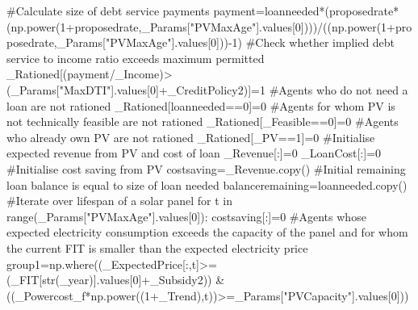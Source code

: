 \documentclass[
  letterpaper,
  DIV=11,
  numbers=noendperiod]{scrartcl}
\newenvironment{Shaded}{\begin{snugshade}}{\end{snugshade}}
\newcommand{\BuiltInTok}[1]{\textcolor[rgb]{0.00,0.23,0.31}{#1}}
\newcommand{\CommentTok}[1]{\textcolor[rgb]{0.37,0.37,0.37}{#1}}
\newcommand{\ControlFlowTok}[1]{\textcolor[rgb]{0.00,0.23,0.31}{#1}}
\newcommand{\DecValTok}[1]{\textcolor[rgb]{0.68,0.00,0.00}{#1}}
\newcommand{\KeywordTok}[1]{\textcolor[rgb]{0.00,0.23,0.31}{#1}}
\newcommand{\NormalTok}[1]{\textcolor[rgb]{0.00,0.23,0.31}{#1}}
\newcommand{\OperatorTok}[1]{\textcolor[rgb]{0.37,0.37,0.37}{#1}}
\newcommand{\StringTok}[1]{\textcolor[rgb]{0.13,0.47,0.30}{#1}}
\begin{document}
\begin{Shaded}
\begin{Highlighting}[]
    \CommentTok{\#Calculate size of debt service payments}
\NormalTok{    payment}\OperatorTok{=}\NormalTok{loanneeded}\OperatorTok{*}\NormalTok{(proposedrate}\OperatorTok{*}\NormalTok{(np.power(}\DecValTok{1}\OperatorTok{+}\NormalTok{proposedrate,\_Params[}\StringTok{"PVMaxAge"}\NormalTok{].values[}\DecValTok{0}\NormalTok{])))}\OperatorTok{/}\NormalTok{((np.power(}\DecValTok{1}\OperatorTok{+}\NormalTok{proposedrate,\_Params[}\StringTok{"PVMaxAge"}\NormalTok{].values[}\DecValTok{0}\NormalTok{]))}\OperatorTok{{-}}\DecValTok{1}\NormalTok{)}
    \CommentTok{\#Check whether implied debt service to income ratio exceeds maximum permitted}
\NormalTok{    \_Rationed[(payment}\OperatorTok{/}\NormalTok{\_Income)}\OperatorTok{\textgreater{}}\NormalTok{(\_Params[}\StringTok{"MaxDTI"}\NormalTok{].values[}\DecValTok{0}\NormalTok{]}\OperatorTok{+}\NormalTok{\_CreditPolicy2)]}\OperatorTok{=}\DecValTok{1}
    \CommentTok{\#Agents who do not need a loan are not rationed}
\NormalTok{    \_Rationed[loanneeded}\OperatorTok{==}\DecValTok{0}\NormalTok{]}\OperatorTok{=}\DecValTok{0}
    \CommentTok{\#Agents for whom PV is not technically feasible are not rationed}
\NormalTok{    \_Rationed[\_Feasible}\OperatorTok{==}\DecValTok{0}\NormalTok{]}\OperatorTok{=}\DecValTok{0}
    \CommentTok{\#Agents who already own PV are not rationed}
\NormalTok{    \_Rationed[\_PV}\OperatorTok{==}\DecValTok{1}\NormalTok{]}\OperatorTok{=}\DecValTok{0}
    \CommentTok{\#Initialise expected revenue from PV and cost of loan}
\NormalTok{    \_Revenue[:]}\OperatorTok{=}\DecValTok{0}
\NormalTok{    \_LoanCost[:]}\OperatorTok{=}\DecValTok{0}
    \CommentTok{\#Initialise cost saving from PV}
\NormalTok{    costsaving}\OperatorTok{=}\NormalTok{\_Revenue.copy()}
    \CommentTok{\#Initial remaining loan balance is equal to size of loan needed}
\NormalTok{    balanceremaining}\OperatorTok{=}\NormalTok{loanneeded.copy()}
    \CommentTok{\#Iterate over lifespan of a solar panel}
    \ControlFlowTok{for}\NormalTok{ t }\KeywordTok{in} \BuiltInTok{range}\NormalTok{(\_Params[}\StringTok{"PVMaxAge"}\NormalTok{].values[}\DecValTok{0}\NormalTok{]):}
\NormalTok{        costsaving[:]}\OperatorTok{=}\DecValTok{0}
        \CommentTok{\#Agents whose expected electricity consumption exceeds the capacity of the panel and for whom the current FIT is smaller than the expected electricity price}
\NormalTok{        group1}\OperatorTok{=}\NormalTok{np.where((\_ExpectedPrice[:,t]}\OperatorTok{\textgreater{}=}\NormalTok{(\_FIT[}\BuiltInTok{str}\NormalTok{(\_year)].values[}\DecValTok{0}\NormalTok{]}\OperatorTok{+}\NormalTok{\_Subsidy2)) }\OperatorTok{\&}\NormalTok{ ((\_Powercost\_f}\OperatorTok{*}\NormalTok{np.power((}\DecValTok{1}\OperatorTok{+}\NormalTok{\_Trend),t))}\OperatorTok{\textgreater{}=}\NormalTok{\_Params[}\StringTok{"PVCapacity"}\NormalTok{].values[}\DecValTok{0}\NormalTok{]))}

\end{Highlighting}
\end{Shaded}
\end{document}
